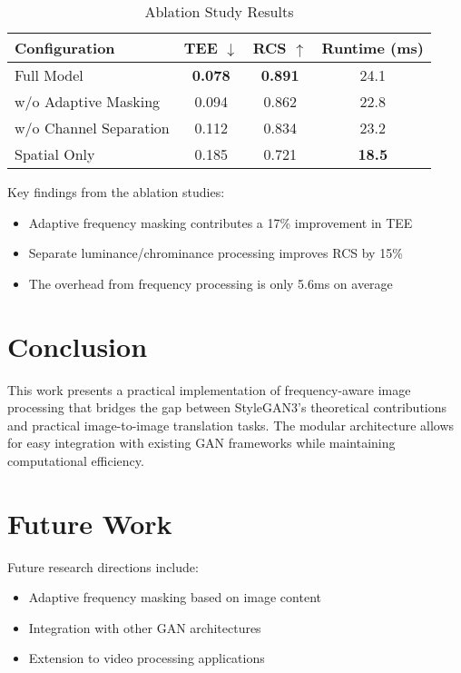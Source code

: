 \documentclass{article}
\begin{document}
\begin{table}[h]
\centering
\caption{Ablation Study Results}
\begin{tabular}{lccc}
\toprule
\textbf{Configuration} & \textbf{TEE} $\downarrow$ & \textbf{RCS} $\uparrow$ & \textbf{Runtime} (ms) \\
\midrule
Full Model & \textbf{0.078} & \textbf{0.891} & 24.1 \\
w/o Adaptive Masking & 0.094 & 0.862 & 22.8 \\
w/o Channel Separation & 0.112 & 0.834 & 23.2 \\
Spatial Only & 0.185 & 0.721 & \textbf{18.5} \\
\bottomrule
\end{tabular}
\end{table}

Key findings from the ablation studies:
\begin{itemize}
\item Adaptive frequency masking contributes a 17\% improvement in TEE
\item Separate luminance/chrominance processing improves RCS by 15\%
\item The overhead from frequency processing is only 5.6ms on average
\end{itemize}

\section{Conclusion}
This work presents a practical implementation of frequency-aware image processing that bridges the gap between StyleGAN3's theoretical contributions and practical image-to-image translation tasks. The modular architecture allows for easy integration with existing GAN frameworks while maintaining computational efficiency.

\section{Future Work}
Future research directions include:
\begin{itemize}
\item Adaptive frequency masking based on image content
\item Integration with other GAN architectures
\item Extension to video processing applications
\end{itemize}
\end{document}
